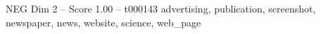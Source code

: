 \begin{textsample}{NEG Dim 2 – Score 1.00 – t000143}  \label{ex:f2_neg_035}
advertising, publication, screenshot, newspaper, news, website, science, web\_page

\end{textsample}
